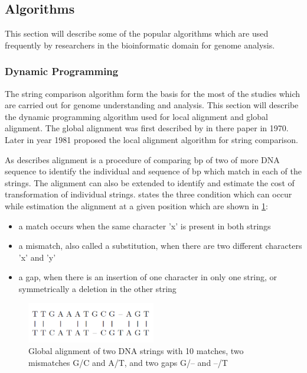 \documentclass[12pt,twoside]{article}
\begin{document}
\subsection{Algorithms}

This section will describe some of the popular algorithms which are used frequently by researchers in the bioinformatic
domain for genome analysis.

\subsubsection{Dynamic Programming}
\label{subsec:dp}

The string comparison algorithm form the basis for the most of the studies which are carried out for
genome understanding and analysis. This section will describe the dynamic programming algorithm
used for local alignment and global alignment. The global alignment was first described by \textcite{needleman_general_1970}
in there paper in 1970. Later in year 1981 \textcite{smith_identification_1981} proposed the local alignment algorithm
for string comparison.

As \textcite[Chapter 3]{mount_bioinformatics:_2004} describes alignment is a procedure of comparing bp of two of more DNA sequence
to identify the individual and sequence of bp which match in each of the strings. The alignment can also be extended to
identify and estimate the cost of transformation of individual strings. \cite{gokhale_reconfigurable_2010} states the three
condition which can occur while estimation the alignment at a given position which are shown in \cref{fig:alignment}:

\begin{itemize}
	\item a match occurs when the same character 'x' is present in both strings
	\item a mismatch, also called a substitution, when there are two different characters 'x' and 'y'
	\item a gap, when there is an insertion of one character in only one string, or symmetrically a deletion in the other string
\end{itemize}

\begin{figure}%
    \centering
    \includegraphics[width=0.5\textwidth]{fig/alignment}
    \caption{Global alignment of two DNA strings with 10 matches, two mismatches
	G/C and A/T, and two gaps G/– and –/T \cite[Figure 8.2]{gokhale_reconfigurable_2010}}
    \label{fig:alignment}
\end{figure}
\end{document}
